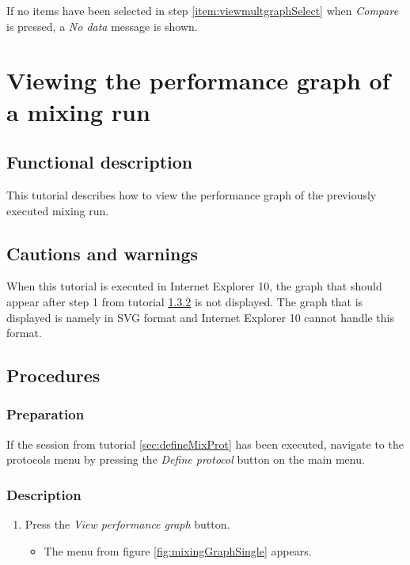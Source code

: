 If no items have been selected in step \ref{item:viewmultgraphSelect} when \emph{Compare} is pressed, a \emph{No data} message is shown.


\section{Viewing the performance graph of a mixing run}\label{sec:viewsinglegraph}

\subsection{Functional description}
This tutorial describes how to view the performance graph of the previously executed mixing run.

\subsection{Cautions and warnings}
When this tutorial is executed in Internet Explorer 10, the graph that should appear after step 1 from tutorial  \ref{subsubsec:viewsinglegraphDesc} is not displayed. The graph that is displayed is namely in SVG format and Internet Explorer 10 cannot handle this format.

\subsection{Procedures}

\subsubsection{Preparation}
If the session from tutorial \ref{sec:defineMixProt} has been executed, navigate to the protocols menu by pressing the \emph{Define protocol} button on the main menu.

\subsubsection{Description}\label{subsubsec:viewsinglegraphDesc}
\begin{enumerate}
	\item Press the \emph{View performance graph} button.
		\begin{itemize}
			\item The menu from figure \ref{fig:mixingGraphSingle} appears.
		\end{itemize}	
\end{enumerate}

